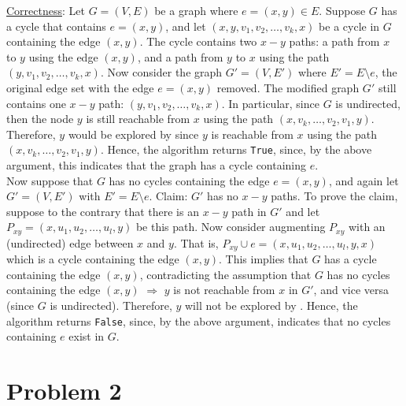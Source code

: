 \documentclass[twoside,11pt]{homework}
\begin{document}
\noindent
\underline{Correctness}:  Let $G = (V, E)$ be a graph where $e = (x,y) \in E$.  Suppose $G$ has a cycle that contains $e = (x, y)$,  and let $(x, y,  v_1, v_2,  \dots,  v_k,  x)$ be a cycle in $G$ containing the edge $(x,y)$.  The cycle contains two $x-y$ paths: a path from $x$ to $y$ using the edge $(x,y)$,  and a path from $y$ to $x$ using the path $(y, v_1, v_2, \dots, v_k, x)$.  Now consider the graph $G' = (V, E')$ where $E' = E \setminus e$, the original edge set with the edge $e = (x,y)$ removed.  The modified graph $G'$ still contains one $x-y$ path: $(y,  v_1, v_2,  \dots,  v_k,  x)$.  In particular, since $G$ is undirected, then the node $y$ is still reachable from $x$ using the path $(x, v_k,  \dots,  v_2, v_1, y)$.  Therefore,  $y$ would be explored by  since $y$ is reachable from $x$ using the path $(x, v_k,  \dots,  v_2, v_1, y)$.   Hence,  the algorithm returns \texttt{True},  since, by the above argument, this indicates that the graph has a cycle containing $e$.  \\

\noindent
Now suppose that $G$ has no cycles containing the edge $e = (x, y)$, and again let $G' = (V, E')$ with $E' = E \setminus e$.  Claim: $G'$ has no $x-y$ paths.  To prove the claim,  suppose to the contrary that there is an $x-y$ path in $G'$ and let $P_{xy} = (x, u_1, u_2, \dots, u_l, y)$ be this path.  Now consider augmenting $P_{xy}$ with an (undirected) edge between $x$ and $y$.  That is,  $P_{xy} \cup e = (x, u_1, u_2, \dots, u_l, y, x)$ which is a cycle containing the edge $(x, y)$. This implies that $G$ has a cycle containing the edge $(x,y)$,  contradicting the assumption that $G$ has no cycles containing the edge $(x,y)$ $\Longrightarrow$ $y$ is not reachable from $x$ in $G'$, and vice versa (since $G$ is undirected). Therefore, $y$ will not be explored by . Hence, the algorithm returns \texttt{False}, since, by the above argument, indicates that no cycles containing $e$ exist in $G$. 
 \\







\section*{Problem 2}
\end{document}
